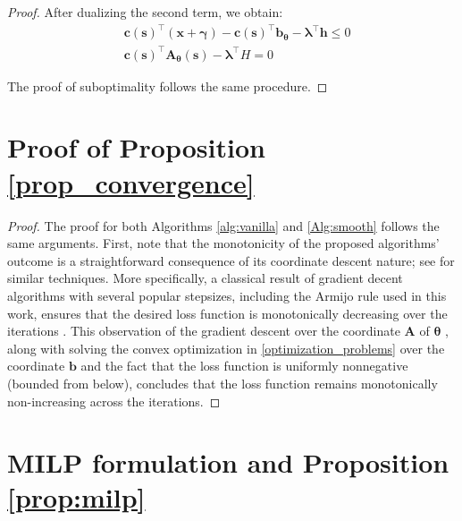 \documentclass{article}
\theoremstyle{plain}
\begin{document}
\begin{proof}
After dualizing the second term, we obtain:
\begin{align}
    &\bm c(\bm s)^\top(\bm x+\bm\gamma) - \bm c(\bm s)^\top \bm b_{\bm\theta} - \bm \lambda^\top\bm h \leq 0 \\
    & \bm c(\bm s)^\top \bm A_{\bm\theta}(\bm s) - \bm \lambda^\top H = 0
\end{align}

The proof of suboptimality follows the same procedure.

\end{proof}



{%
\section{Proof of Proposition \ref{prop_convergence}} 
\begin{proof}
The proof for both Algorithms \ref{alg:vanilla} and \ref{Alg:smooth} follows the same arguments. First, note that the monotonicity of the proposed algorithms' outcome is a straightforward consequence of its coordinate descent nature; see \citep[Section 6.5]{bertsekas2015convex} for similar techniques. More specifically, a classical result of gradient decent algorithms with several popular stepsizes, including the Armijo rule used in this work, ensures that the desired loss function is monotonically decreasing over the iterations \citep[Section 2.1]{bertsekas2015convex}. This observation of the gradient descent over the coordinate $\bm A$  of $\bm \theta$ , along with solving the convex optimization in \eqref{optimization_problems} over the coordinate $\bm b$ and the fact that the loss function is uniformly nonnegative (bounded from below), concludes that the loss function remains monotonically non-increasing across the iterations. 
\end{proof}
}

\section{MILP formulation and Proposition \ref{prop:milp}} \label{app:prop:milp}
\end{document}
